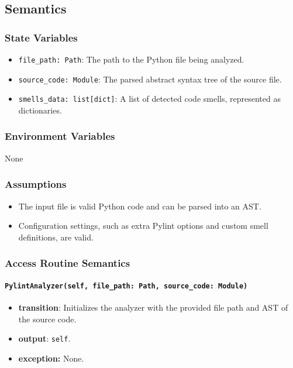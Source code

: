 \documentclass[12pt, titlepage]{article}
\begin{document}
\subsection{Semantics}

\subsubsection{State Variables}
\begin{itemize}
  \item \texttt{file\_path: Path}: The path to the Python file being analyzed.
  \item \texttt{source\_code: Module}: The parsed abstract syntax tree of the source file.
  \item \texttt{smells\_data: list[dict]}: A list of detected code smells, represented as dictionaries.
\end{itemize}

\subsubsection{Environment Variables}
None

\subsubsection{Assumptions}
\begin{itemize}
  \item The input file is valid Python code and can be parsed into an AST.
  \item Configuration settings, such as extra Pylint options and custom smell definitions, are valid.
\end{itemize}

\subsubsection{Access Routine Semantics}

\paragraph{\texttt{PylintAnalyzer(self, file\_path: Path, source\_code: Module)}}
\begin{itemize}
  \item \textbf{transition}: Initializes the analyzer with the provided file path and AST of the source code.
  \item \textbf{output}: \texttt{self}.
  \item \textbf{exception:} None.
\end{itemize}
\end{document}

